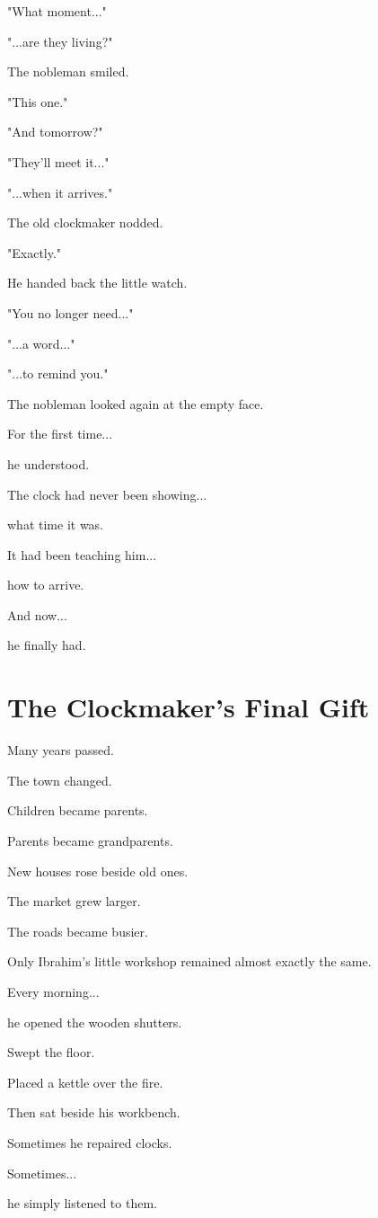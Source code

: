 \documentclass[12pt,openany]{book}
\begin{document}
"What moment..."

"...are they living?"

The nobleman smiled.

"This one."

"And tomorrow?"

"They'll meet it..."

"...when it arrives."

The old clockmaker nodded.

"Exactly."

He handed back the little watch.

"You no longer need..."

"...a word..."

"...to remind you."

The nobleman looked again at the empty face.

For the first time...

he understood.

The clock had never been showing...

what time it was.

It had been teaching him...

how to arrive.

And now...

he finally had.
\section*{The Clockmaker's Final Gift}

Many years passed.

The town changed.

Children became parents.

Parents became grandparents.

New houses rose beside old ones.

The market grew larger.

The roads became busier.

Only Ibrahim's little workshop remained almost exactly the same.

Every morning...

he opened the wooden shutters.

Swept the floor.

Placed a kettle over the fire.

Then sat beside his workbench.

Sometimes he repaired clocks.

Sometimes...

he simply listened to them.
\end{document}
